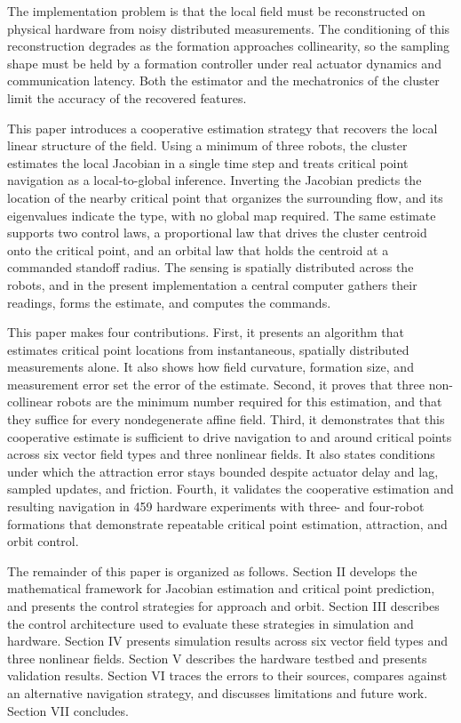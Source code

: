 \documentclass[lettersize,journal]{IEEEtran}
\newcommand{\rev}[1]{#1}
\begin{document}
The implementation problem is that the local field must be reconstructed on physical hardware from noisy distributed measurements. The conditioning of this reconstruction degrades as the formation approaches collinearity, so the sampling shape must be held by a formation controller under real actuator dynamics and communication latency. Both the estimator and the mechatronics of the cluster limit the accuracy of the recovered features.

This paper introduces a cooperative estimation strategy that recovers the local linear structure of the field. Using a minimum of three robots, the cluster estimates the local Jacobian in a single time step and treats critical point navigation as a local-to-global inference. Inverting the Jacobian predicts the location of the nearby critical point that organizes the surrounding flow, and its eigenvalues indicate the type, with no global map required. The same estimate supports two control laws, a proportional law that drives the cluster centroid onto the critical point, and an orbital law that holds the centroid at a commanded standoff radius. The sensing is spatially distributed across the robots, and in the present implementation a central computer gathers their readings, forms the estimate, and computes the commands.

This paper makes four contributions. First, it presents an algorithm that estimates critical point locations from instantaneous, spatially distributed measurements alone. It also shows how field curvature, formation size, and measurement error set the error of the estimate. Second, it proves that three non-collinear robots are the minimum number required for this estimation, and that they suffice for every nondegenerate affine field. Third, it demonstrates that this cooperative estimate is sufficient to drive navigation to and around critical points across six vector field types and three nonlinear fields. It also states conditions under which the attraction error stays bounded despite actuator delay and lag, sampled updates, and friction. Fourth, it validates the cooperative estimation and resulting navigation in \rev{459} hardware experiments with three- and four-robot formations that demonstrate repeatable critical point estimation, attraction, and orbit control.

The remainder of this paper is organized as follows. Section II develops the mathematical framework for Jacobian estimation and critical point prediction, and presents the control strategies for approach and orbit. Section III describes the control architecture used to evaluate these strategies in simulation and hardware. Section IV presents simulation results across six vector field types and three nonlinear fields. Section V describes the hardware testbed and presents validation results. Section VI traces the errors to their sources, compares against an alternative navigation strategy, and discusses limitations and future work. Section VII concludes.
\end{document}
